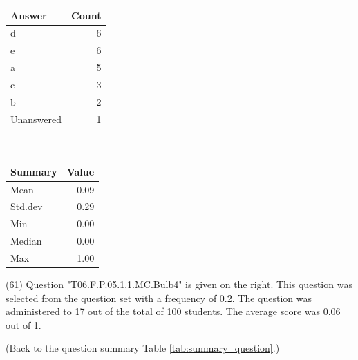 \documentclass[12pt,nohyper]{tufte-handout}\usepackage[]{graphicx}\usepackage[]{color}
\begin{document}
\begin{center}%
\begin{tabular}{lr}
  \hline
Answer & Count \\ 
  \hline
d &   6 \\ 
  e &   6 \\ 
  a &   5 \\ 
  c &   3 \\ 
  b &   2 \\ 
  Unanswered &   1 \\ 
   \hline
\end{tabular}
~~~~~~~~%
\begin{tabular}{lr}
  \hline
Summary & Value \\ 
  \hline
Mean & 0.09 \\ 
  Std.dev & 0.29 \\ 
  Min & 0.00 \\ 
  Median & 0.00 \\ 
  Max & 1.00 \\ 
   \hline
\end{tabular}
\end{center}\newpage{} (61) Question "T06.F.P.05.1.1.MC.Bulb4" is given on the right. This question was selected from the question set with a frequency of 0.2. The question was administered to 17 out of the total of 100 students. The average score was 0.06 out of 1.

 (Back to the question summary Table \ref{tab:summary_question}.)
\end{document}
